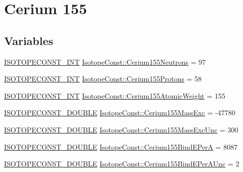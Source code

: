 \hypertarget{group___isotope_const-_cerium-_ce155}{}\section{Cerium 155}
\label{group___isotope_const-_cerium-_ce155}
\subsection*{Variables}
\begin{DoxyCompactItemize}
\item 
\mbox{\hyperlink{group___isotope_const-_macros_ga5f18360b3e99483a35c32d789e62621c}{I\+S\+O\+T\+O\+P\+E\+C\+O\+N\+S\+T\+\_\+\+I\+NT}} \mbox{\hyperlink{group___isotope_const-_cerium-_ce155_ga23a6b92a2171f30f4895f36ec01e4354}{Isotope\+Const\+::\+Cerium155\+Neutrons}} = 97
\item 
\mbox{\hyperlink{group___isotope_const-_macros_ga5f18360b3e99483a35c32d789e62621c}{I\+S\+O\+T\+O\+P\+E\+C\+O\+N\+S\+T\+\_\+\+I\+NT}} \mbox{\hyperlink{group___isotope_const-_cerium-_ce155_gaac4ac86a736281059c4a9714d1657f51}{Isotope\+Const\+::\+Cerium155\+Protons}} = 58
\item 
\mbox{\hyperlink{group___isotope_const-_macros_ga5f18360b3e99483a35c32d789e62621c}{I\+S\+O\+T\+O\+P\+E\+C\+O\+N\+S\+T\+\_\+\+I\+NT}} \mbox{\hyperlink{group___isotope_const-_cerium-_ce155_gae65654aa1d2918ffeab0b800d4e6127e}{Isotope\+Const\+::\+Cerium155\+Atomic\+Weight}} = 155
\item 
\mbox{\hyperlink{group___isotope_const-_macros_ga8f45a7272ce02c0b4c65c44636ed719a}{I\+S\+O\+T\+O\+P\+E\+C\+O\+N\+S\+T\+\_\+\+D\+O\+U\+B\+LE}} \mbox{\hyperlink{group___isotope_const-_cerium-_ce155_ga33e4dfb9c826c327aa369e4997dac170}{Isotope\+Const\+::\+Cerium155\+Mass\+Exc}} = -\/47780
\item 
\mbox{\hyperlink{group___isotope_const-_macros_ga8f45a7272ce02c0b4c65c44636ed719a}{I\+S\+O\+T\+O\+P\+E\+C\+O\+N\+S\+T\+\_\+\+D\+O\+U\+B\+LE}} \mbox{\hyperlink{group___isotope_const-_cerium-_ce155_ga97625a1528128cf039b8f7db3e4244ce}{Isotope\+Const\+::\+Cerium155\+Mass\+Exc\+Unc}} = 300
\item 
\mbox{\hyperlink{group___isotope_const-_macros_ga8f45a7272ce02c0b4c65c44636ed719a}{I\+S\+O\+T\+O\+P\+E\+C\+O\+N\+S\+T\+\_\+\+D\+O\+U\+B\+LE}} \mbox{\hyperlink{group___isotope_const-_cerium-_ce155_gabf6736d049a21782c628ba1f3927fe46}{Isotope\+Const\+::\+Cerium155\+Bind\+E\+PerA}} = 8087
\item 
\mbox{\hyperlink{group___isotope_const-_macros_ga8f45a7272ce02c0b4c65c44636ed719a}{I\+S\+O\+T\+O\+P\+E\+C\+O\+N\+S\+T\+\_\+\+D\+O\+U\+B\+LE}} \mbox{\hyperlink{group___isotope_const-_cerium-_ce155_gabb41da45ea61e27d9e3bb5c9b782bbca}{Isotope\+Const\+::\+Cerium155\+Bind\+E\+Per\+A\+Unc}} = 2

\end{DoxyCompactItemize}
